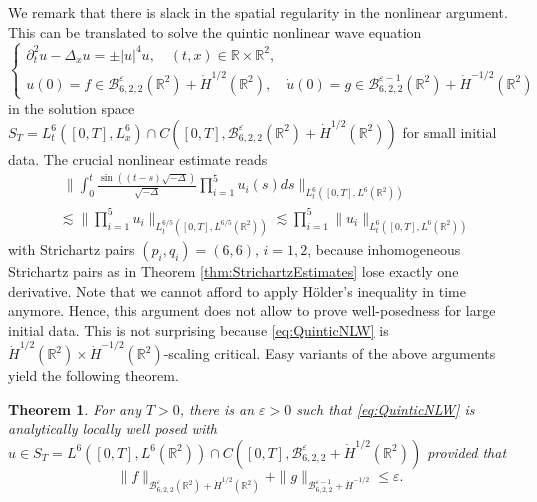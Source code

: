 \documentclass{amsart}
\newtheorem{theorem}{Theorem}[section]
\theoremstyle{definition}
\newcommand{\R}{\mathbb{R}}
\newcommand {\Rtwo}{\mathbb{R}^{2}}
\numberwithin{equation}{section}
\begin{document}
We remark that there is slack in the spatial regularity in the nonlinear argument. This can be translated to solve the quintic nonlinear wave equation
\begin{equation}
\label{eq:QuinticNLW}
\begin{cases}
\partial_t^2 u - \Delta_{x} u = \pm |u|^4 u, \quad (t,x) \in \R \times \R^2, \\
u(0) = f \in \mathcal{B}^\varepsilon_{6,2,2}(\R^2) + \dot{H}^{1/2}(\R^2), \quad \dot{u}(0) = g \in \mathcal{B}^{\varepsilon-1}_{6,2,2}(\R^2) + \dot{H}^{-1/2}(\R^2)
\end{cases}
\end{equation}
in the solution space $S_T = L_t^6([0,T], L_x^6) \cap C([0,T], \mathcal{B}^\varepsilon_{6,2,2}(\R^2) + \dot{H}^{1/2}(\R^2))$ for small initial data. The crucial nonlinear estimate reads
\begin{equation*}
\begin{split}
&\; \Big\| \int_0^t \frac{\sin((t-s) \sqrt{- \Delta})}{\sqrt{-\Delta}} \prod_{i=1}^5 u_i(s) ds \Big\|_{L_t^6([0,T],L^6(\R^2))} \\
&\lesssim \Big\| \prod_{i=1}^5 u_i \Big\|_{L_t^{6/5}([0,T], L^{6/5}(\Rtwo))} \lesssim \prod_{i=1}^5 \| u_i \|_{L_t^6([0,T], L^6(\Rtwo))}
\end{split}
\end{equation*}
with Strichartz pairs $(p_i,q_i) = (6,6)$, $i=1,2$, because inhomogeneous Strichartz pairs as in Theorem \ref{thm:StrichartzEstimates} lose exactly one derivative. Note that we cannot afford to apply H\"older's inequality in time anymore. Hence, this argument does not allow to prove well-posedness for large initial data. This is not surprising because \eqref{eq:QuinticNLW} is $\dot{H}^{1/2}(\R^2) \times \dot{H}^{-1/2}(\R^2)$-scaling critical. Easy variants of the above arguments yield the following theorem.


\begin{theorem}
\label{thm:LWPQuinticNLW}
For any $T > 0$, there is an $\varepsilon > 0$ such that \eqref{eq:QuinticNLW} is analytically locally well posed with $u \in S_T = L^6([0,T],L^6(\R^2)) \cap C([0,T],\mathcal{B}^\varepsilon_{6,2,2} + \dot{H}^{1/2}(\R^2))$  provided that
\begin{equation*}
\| f \|_{\mathcal{B}^\varepsilon_{6,2,2}(\R^2) + \dot{H}^{1/2}(\R^2)} + \| g \|_{\mathcal{B}^{\varepsilon-1}_{6,2,2} + \dot{H}^{-1/2}} \leq \varepsilon.
\end{equation*}
\end{theorem}
\end{document}

